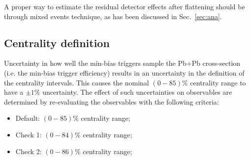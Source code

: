 A proper way to estimate the residual detector effects after flattening should be through mixed events technique, as has been discussed in Sec.~\ref{sec:ana}.



\subsection{Centrality definition}
Uncertainty in how well the min-bias triggers sample the Pb+Pb cross-section (i.e. the min-bias trigger efficiency) results in an uncertainty in the definition of the centrality intervals. This causes the nominal $(0-85)\%$ centrality range to have a $\pm 1\%$ uncertainty. The effect of such uncertainties on observables are determined by re-evaluating the observables with the following criteria:
\begin{itemize}
\item Default: $(0-85)\%$ centrality range;
\item Check 1: $(0-84)\%$ centrality range;
\item Check 2: $(0-86)\%$ centrality range;
\end{itemize}


